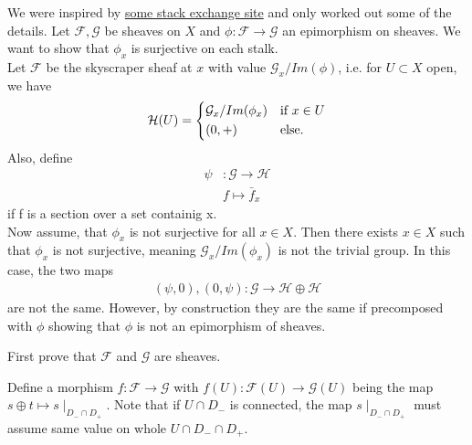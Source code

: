 \begin{exercise}{3}
\begin{enumerate}
{{            We were inspired by
            \href{https://math.stackexchange.com/questions/205658/an-easy-way-to-prove-that-epimorphism-of-sheaves-implies-surjectivity-on-stalk?rq=1}{some
            stack exchange site} and only worked out some of the details.
            Let $\mathcal{F}, \mathcal{G}$ be sheaves on $X$ and $\phi:\mathcal{F}\to \mathcal{G}$ an 
            epimorphism on sheaves. We want to show that $\phi_x$ is surjective on each stalk.\\
            Let $\mathcal{F}$ be the skyscraper sheaf at $x$ with value $\mathcal{G}_x/Im(\phi)$, i.e. for 
            $U\subset X$ open, we have
            \begin{equation*}
                \mathcal{H}(U)=
                \begin{cases*}
                    \mathcal{G}_x/Im(\phi_x) & \text{if} $x\in U$\\
                    (0,+) & else.
                \end{cases*}
            \end{equation*}
            Also, define
            \begin{align*}
                \psi&:\mathcal{G}\to \mathcal{H}\\
                    &f\mapsto \bar{f}_x
            \end{align*}
            if f is a section over a set containig x. \\
            Now assume, that $\phi_x$ is not surjective for all $x\in X$.
            Then there exists $x\in X$ such that $\phi_x$ is not surjective,
            meaning $\mathcal{G}_x/Im(\phi_x)$ is not the trivial group. 
            In this case, the two maps 
            \begin{align*}
                (\psi,0),(0,\psi):\mathcal{G}\to \mathcal{H} \oplus \mathcal{H}
            \end{align*}
            are not the same. However, by
            construction they are the same if precomposed with $\phi$ showing that
            $\phi$ is not an epimorphism of sheaves.
            }\label{ex3.2}
        \item First prove that $\mathcal{F}$ and $\mathcal{G}$ are sheaves.

            Define a morphism $f \colon \mathcal{F} \rightarrow \mathcal{G}$
            with $f(U) \colon \mathcal{F}(U) \rightarrow \mathcal{G}(U)$ being
            the map $s \oplus t \mapsto s \mid_{D_- \cap D_+}$. Note that if $U
            \cap D_-$ is connected, the map $s \mid_{D_- \cap D_+}$ must assume
            same value on whole $U \cap D_- \cap D_+$.

}
\end{enumerate}
\end{exercise}
